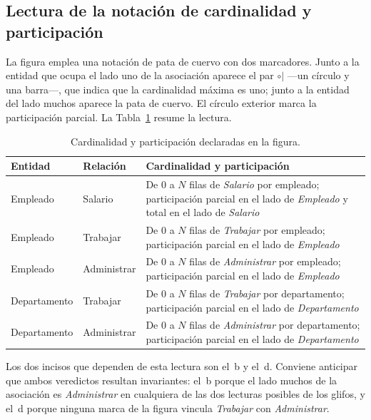 \subsection{Lectura de la notación de cardinalidad y participación}

La figura emplea una notación de pata de cuervo con dos marcadores. Junto a la
entidad que ocupa el lado uno de la asociación aparece el par $\circ|$ ---un
círculo y una barra---, que indica que la cardinalidad máxima es uno; junto a
la entidad del lado muchos aparece la pata de cuervo. El círculo exterior
marca la participación parcial. La Tabla~\ref{tab:cardin} resume la lectura.

\begin{table}[htbp]
  \centering \caption{Cardinalidad y participación declaradas en la figura.}
  \label{tab:cardin}
  \small
  \begin{tabularx}{\textwidth}{@{}l l >{\raggedright\arraybackslash} X@{}}
    \toprule
    \textbf{Entidad} & \textbf{Relación} & \textbf{Cardinalidad y participación} \\
    \midrule
    Empleado & Salario
      & De $0$ a $N$ filas de \emph{Salario} por empleado; participación
        parcial en el lado de \emph{Empleado} y total en el lado de
        \emph{Salario} \\
    Empleado & Trabajar
      & De $0$ a $N$ filas de \emph{Trabajar} por empleado; participación
        parcial en el lado de \emph{Empleado} \\
    Empleado & Administrar
      & De $0$ a $N$ filas de \emph{Administrar} por empleado; participación
        parcial en el lado de \emph{Empleado} \\
    Departamento & Trabajar
      & De $0$ a $N$ filas de \emph{Trabajar} por departamento; participación
        parcial en el lado de \emph{Departamento} \\
    Departamento & Administrar
      & De $0$ a $N$ filas de \emph{Administrar} por departamento;
        participación parcial en el lado de \emph{Departamento} \\
    \bottomrule
  \end{tabularx}
\end{table}

Los dos incisos que dependen de esta lectura son el~b y el~d. Conviene
anticipar que ambos veredictos resultan invariantes: el~b porque el lado
muchos de la asociación es \emph{Administrar} en cualquiera de las dos
lecturas posibles de los glifos, y el~d porque ninguna marca de la figura
vincula \emph{Trabajar} con \emph{Administrar}.

